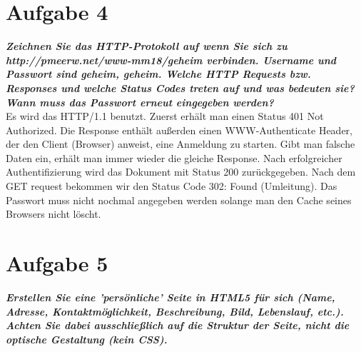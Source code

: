\documentclass[12pt, a4paper]{report}
\begin{document}
\section*{Aufgabe 4}
\textbf{\textit{Zeichnen Sie das HTTP-Protokoll auf wenn Sie sich zu http://pmeerw.net/www-mm18/geheim verbinden. Username und Passwort sind geheim, geheim. Welche HTTP Requests bzw. Responses und welche Status Codes treten auf und was bedeuten sie? Wann muss das Passwort erneut eingegeben werden?}}\\
Es wird das HTTP/1.1 benutzt. Zuerst erhält man einen Status 401 Not Authorized. Die Response enthält außerden einen WWW-Authenticate Header, der den Client (Browser) anweist, eine Anmeldung zu starten. Gibt man falsche Daten ein, erhält man immer wieder die gleiche Response. Nach erfolgreicher Authentifizierung wird das Dokument mit Status 200 zurückgegeben. Nach dem GET request bekommen wir den Status Code 302: Found (Umleitung). Das Passwort muss nicht nochmal angegeben werden solange man den Cache seines Browsers nicht löscht.\\


\section*{Aufgabe 5}
\textbf{\textit{Erstellen Sie eine ’persönliche’ Seite in HTML5 für sich (Name, Adresse, Kontaktmöglichkeit, Beschreibung, Bild, Lebenslauf, etc.). Achten Sie dabei ausschließlich auf die Struktur der Seite, nicht die optische Gestaltung (kein CSS).}}
\end{document}
